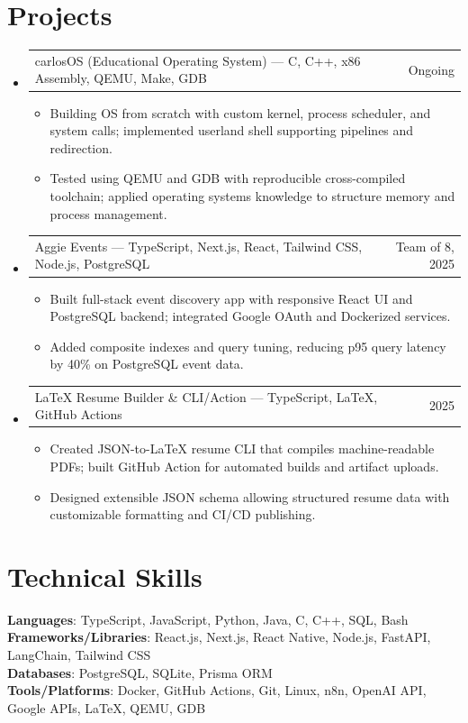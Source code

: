 \documentclass[letterpaper,11pt]{article}
\makeatletter
\newcommand{\resumeItem}[1]{
  \item\small{{#1 \vspace{-2pt}}}
}
\newcommand{\resumeProjectHeading}[2]{
    \item
    \begin{tabular*}{0.97\textwidth}{l@{\extracolsep{\fill}}r}
      \small#1 & #2 \\
    \end{tabular*}\vspace{-7pt}
}
\newcommand{\resumeSubHeadingListStart}{\begin{itemize}[leftmargin=0.15in, label={}]}
\newcommand{\resumeSubHeadingListEnd}{\end{itemize}}
\newcommand{\resumeItemListStart}{\begin{itemize}}
\newcommand{\resumeItemListEnd}{\end{itemize}\vspace{-5pt}}
\makeatother
\begin{document}
\section{Projects}
\resumeSubHeadingListStart
  \resumeProjectHeading
    {carlosOS (Educational Operating System) — C, C++, x86 Assembly, QEMU, Make, GDB}
    {Ongoing}
    \resumeItemListStart
      \resumeItem{Building OS from scratch with custom kernel, process scheduler, and system calls; implemented userland shell supporting pipelines and redirection.}
      \resumeItem{Tested using QEMU and GDB with reproducible cross-compiled toolchain; applied operating systems knowledge to structure memory and process management.}
    \resumeItemListEnd

  \resumeProjectHeading
    {Aggie Events — TypeScript, Next.js, React, Tailwind CSS, Node.js, PostgreSQL}
   {Team of 8, 2025}
    \resumeItemListStart
      \resumeItem{Built full-stack event discovery app with responsive React UI and PostgreSQL backend; integrated Google OAuth and Dockerized services.}
      \resumeItem{Added composite indexes and query tuning, reducing p95 query latency by 40\% on PostgreSQL event data.}
    \resumeItemListEnd

  \resumeProjectHeading
    {LaTeX Resume Builder \& CLI/Action — TypeScript, LaTeX, GitHub Actions}
    {2025}
    \resumeItemListStart
      \resumeItem{Created JSON-to-LaTeX resume CLI that compiles machine-readable PDFs; built GitHub Action for automated builds and artifact uploads.}
      \resumeItem{Designed extensible JSON schema allowing structured resume data with customizable formatting and CI/CD publishing.}
    \resumeItemListEnd
\resumeSubHeadingListEnd

\section{Technical Skills}
\begin{itemize}[leftmargin=0.15in, label={}]
  \small{\item{
    \textbf{Languages}{: TypeScript, JavaScript, Python, Java, C, C++, SQL, Bash} \\
    \textbf{Frameworks/Libraries}{: React.js, Next.js, React Native, Node.js, FastAPI, LangChain, Tailwind CSS} \\
    \textbf{Databases}{: PostgreSQL, SQLite, Prisma ORM} \\
    \textbf{Tools/Platforms}{: Docker, GitHub Actions, Git, Linux, n8n, OpenAI API, Google APIs, LaTeX, QEMU, GDB}
  }}
\end{itemize}
\end{document}
